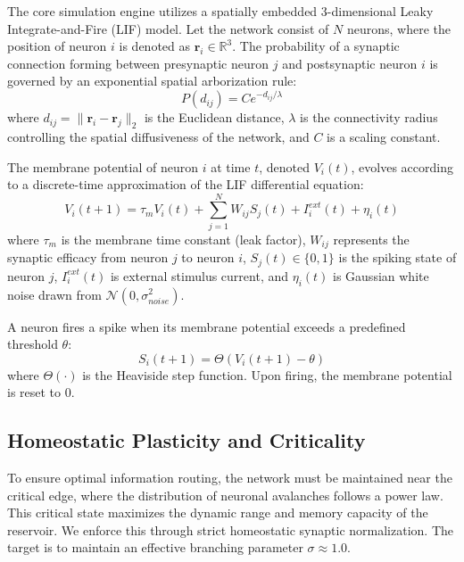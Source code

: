 \documentclass[12pt, a4paper]{article}
\begin{document}
The core simulation engine utilizes a spatially embedded 3-dimensional Leaky Integrate-and-Fire (LIF) model. Let the network consist of $N$ neurons, where the position of neuron $i$ is denoted as $\bm{r}_i \in \mathbb{R}^3$. The probability of a synaptic connection forming between presynaptic neuron $j$ and postsynaptic neuron $i$ is governed by an exponential spatial arborization rule:
\begin{equation}
P(d_{ij}) = C e^{-d_{ij} / \lambda}
\end{equation}
where $d_{ij} = \| \bm{r}_i - \bm{r}_j \|_2$ is the Euclidean distance, $\lambda$ is the connectivity radius controlling the spatial diffusiveness of the network, and $C$ is a scaling constant.

The membrane potential of neuron $i$ at time $t$, denoted $V_i(t)$, evolves according to a discrete-time approximation of the LIF differential equation:
\begin{equation}
V_i(t+1) = \tau_m V_i(t) + \sum_{j=1}^N W_{ij} S_j(t) + I_i^{ext}(t) + \eta_i(t)
\end{equation}
where $\tau_m$ is the membrane time constant (leak factor), $W_{ij}$ represents the synaptic efficacy from neuron $j$ to neuron $i$, $S_j(t) \in \{0, 1\}$ is the spiking state of neuron $j$, $I_i^{ext}(t)$ is external stimulus current, and $\eta_i(t)$ is Gaussian white noise drawn from $\mathcal{N}(0, \sigma_{noise}^2)$.

A neuron fires a spike when its membrane potential exceeds a predefined threshold $\theta$:
\begin{equation}
S_i(t+1) = \Theta(V_i(t+1) - \theta)
\end{equation}
where $\Theta(\cdot)$ is the Heaviside step function. Upon firing, the membrane potential is reset to $0$.

\subsection{Homeostatic Plasticity and Criticality}

To ensure optimal information routing, the network must be maintained near the critical edge, where the distribution of neuronal avalanches follows a power law. This critical state maximizes the dynamic range and memory capacity of the reservoir. We enforce this through strict homeostatic synaptic normalization. The target is to maintain an effective branching parameter $\sigma \approx 1.0$.
\end{document}
